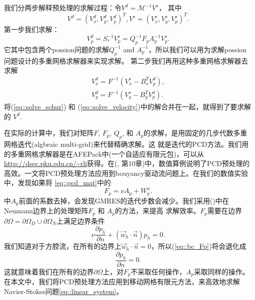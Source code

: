   我们分两步解释预处理的求解过程：令$V^d = \mathcal{M}^{-1} V^s$，
  其中
  \begin{equation}
    V^d = (V_x^d, V_y^d, V_p^d)^T, V^s = (V_x^s, V_y^s, V_p^s)^T.
  \end{equation}
  第一步我们求解：
  \begin{equation}
    V_p^d = S_*^{-1} V_p^s = Q_p^{-1} F_p A_p^{-1} V_p^s.
    \label{eq::solve_schur}
  \end{equation}
  它其中包含两个possion问题的求解$Q_p^{-1}$ and $A_p^{-1}$，所以我们可以用为求解possion问题设计的多重网格求解器来实现求解。
  第二步我们再用这种多重网格求解器去求解
  \begin{equation}
    \begin{aligned}
      V_x^d = F^{-1} (V_x^s - B_x^T V_p^d), \\
      V_y^d = F^{-1} (V_y^s - B_y^T V_p^d).
    \end{aligned}
    \label{eq::solve_velocity}
  \end{equation}
  将(\ref{eq::solve_schur}) 和 (\ref{eq::solve_velocity})中的解合并在一起，就得到了要求解的 $V^d$.

  在实际的计算中，我们对矩阵$F$, $F_p$, $Q_p$, 和 $A_p$的求解，是用固定的几步代数多重网格迭代(algbraic multi-grid)来代替精确求解。这
  就是迭代的PCD方法。我们用的多重网格求解器是在AFEPack中(一个自适应有限元包)，可以从\url{http://dsec.pku.edu.cn/~rli}获得。在(\cite{elman2005finite},
  第10章)中，数值算例说明了PCD预处理的高效。\cite{elman2011fast}一文将PCD预处理方法应用到bouyancy驱动流问题上。在我们的数值实验中，发现如果将
  \eqref{eq::pcd_mat}中的
  \begin{equation}
    F_p = \nu A_p + W_p^n.
  \end{equation}
  中$A_p$前面的系数去掉，会发现GMRES的迭代步数会减少。我们采用(\cite{elman2009boundary})中在Neumann边界上的处理矩阵$F_p$ 和 $A_p$的方法，来提高
  求解效率。$F_p$需要在边界$\partial \Omega = \partial \Omega_D \cup \partial \Omega_N$上满足边界条件
  \begin{equation}
    \nu \frac{\partial p_h}{\partial n} + (\vec{w}_h \cdot \vec{n})
    p_h = 0.
    \label{eq::bc_Fp}
  \end{equation}
  我们知道对于方腔流，在所有的边界上$\vec{w}_h \cdot \vec{n} = 0$，所以(\ref{eq::bc_Fp})将会退化成
  \begin{equation}
    \frac{\partial p_h}{\partial n} = 0.
  \end{equation}
  这就意味着我们在所有的边界$\partial \Omega$上，对$F_p$不采取任何操作，$A_p$采取同样的操作。
  在本文中，我们将PCD预处理方法应用到移动网格有限元方法，来高效地求解Navier-Stokes问题\eqref{eq::linear_system}。
